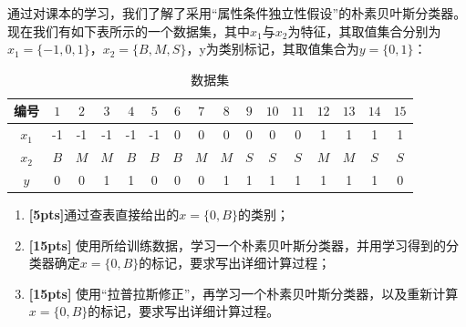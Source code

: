 \documentclass[a4paper,UTF8]{article}
\theoremstyle{definition}
\begin{document}
\par 通过对课本的学习，我们了解了采用“属性条件独立性假设”的朴素贝叶斯分类器。现在我们有如下表所示的一个数据集，其中$x_1$与$x_2$为特征，其取值集合分别为$x_1=\{-1,0,1\}$，$x_2=\{B,M,S\}$，y为类别标记，其取值集合为$y=\{0,1\}$：
\begin{table}[htp]
	\centering
	\caption{数据集}\label{tab:aStrangeTable}
	\begin{tabular}{cccccccccccccccc}
		\hline
		编号  & $1$ & $2$ & $3$ & $4$ & $5$ & $6$ & $7$ & $8$ & $9$ & $10$ & $11$ & $12$ & $13$ & $14$ & $15$ \\
		\hline
		$x_1$ & -1  & -1  & -1  & -1  & -1  & 0   & 0   & 0   & 0   & 0    & 0    & 1    & 1    & 1    & 1    \\
		\hline
		$x_2$ & $B$ & $M$ & $M$ & $B$ & $B$ & $B$ & $M$ & $M$ & $S$ & $S$  & $S$  & $M$  & $M$  & $S$  & $S$  \\
		\hline
		$y$   & 0   & 0   & 1   & 1   & 0   & 0   & 0   & 1   & 1   & 1    & 1    & 1    & 1    & 1    & 0    \\
		\hline
	\end{tabular}
\end{table}

\begin{enumerate}[(1)]
	\item \textbf{[5pts]}通过查表直接给出的$x=\{0,B\}$的类别；
	\item \textbf{[15pts]} 使用所给训练数据，学习一个朴素贝叶斯分类器，并用学习得到的分类器确定$x=\{0,B\}$的标记，要求写出详细计算过程；
	\item \textbf{[15pts]} 使用“拉普拉斯修正”，再学习一个朴素贝叶斯分类器，以及重新计算$x=\{0,B\}$的标记，要求写出详细计算过程。
\end{enumerate}
\end{document}
